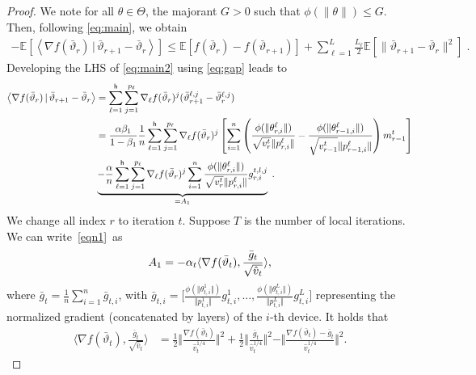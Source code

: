 \documentclass[11pt]{article}
\newcommand{\eqsp}{\;}
\def\EE{\mathbb{E}}
\newcommand{\pscal}[2]{\left\langle#1\,|\,#2 \right\rangle}
\def\tot{\mathsf{h}}
\begin{document}
\begin{proof}
We note for all $\theta \in \Theta$, the majorant $G > 0$ such that $\phi(\|\theta \|) \leq G$. 
Then, following \eqref{eq:main}, we obtain
\begin{align}\label{eq:main2}
- \EE[  \pscal{\nabla f(\bar{\vartheta}_r)}{\bar{\vartheta}_{r+1} - \bar{\vartheta}_r}]  \leq  \EE[ f(\bar{\vartheta}_r) - f(\bar{\vartheta}_{r+1})] + \sum_{\ell =1}^L \frac{L_\ell}{2} \EE[  \| \bar{\vartheta}_{r+1} - \bar{\vartheta}_r \|^2] \eqsp.
\end{align}
Developing the LHS of \eqref{eq:main2} using \eqref{eq:gap} leads to
\begin{align} \notag
\pscal{\nabla f(\bar{\vartheta}_r)}{\bar{\vartheta}_{r+1} - \bar{\vartheta}_r} &= \sum_{\ell=1}^\tot \sum_{j=1}^{p_\ell} \nabla_{\ell} f(\bar{\vartheta}_r)^j (\bar{\vartheta}^{\ell,j}_{r+1} - \bar{\vartheta}^{\ell,j}_r)  \\ \notag
& =  \frac{\alpha \beta_1}{1-\beta_1}\frac{1}{n}  \sum_{\ell=1}^\tot \sum_{j=1}^{p_\ell} \nabla_{\ell} f(\bar{\vartheta}_r)^j \left[   \sum_{i = 1}^n  \left( \frac{\phi(\|\theta_{r,i}^{\ell}\|)}{\sqrt{v^{t}_{r}} \|p_{r,i}^{\ell}\|} - \frac{\phi(\|\theta_{r-1,i}^{\ell}\|)}{\sqrt{v^{t}_{r-1}} \|p_{r-1,i}^{\ell}\|} \right) m^{t}_{r-1}  \right] \\ \label{eqn1}
& \underbrace{ -\frac{\alpha}{n} \sum_{\ell=1}^\tot \sum_{j=1}^{p_\ell} \nabla_{\ell} f(\bar{\vartheta}_r)^j  \sum_{i = 1}^n \frac{\phi(\|\theta_{r,i}^{\ell}\|)}{\sqrt{v^{t}_{r}} \|p_{r,i}^{\ell}\|} g_{r,i}^{t,l,j}}_{= A_1}   \eqsp.
\end{align}
We change all index $r$ to iteration $t$. 
Suppose $T$ is the number of local iterations. We can write~\eqref{eqn1}~as
\begin{align}\notag
    A_1=-\alpha_t \langle \nabla f(\bar \vartheta_t),\frac{\bar g_t}{\sqrt{\hat v_t}} \rangle,
\end{align}
where $\bar g_t=\frac{1}{n}\sum_{i=1}^n \bar g_{t,i}$, with $\bar g_{t,i}=\Big[\frac{\phi(\Vert \theta_{t,i}^1\Vert)}{\Vert p_{t,i}^1\Vert}g_{t,i}^1,..., \frac{\phi(\Vert \theta_{t,i}^L\Vert)}{\Vert p_{t,i}^L\Vert}g_{t,i}^L   \Big]$ representing the normalized gradient (concatenated by layers) of the $i$-th device. It holds that
\begin{align}
    \langle \nabla f(\bar \vartheta_t),\frac{\bar g_t}{\sqrt{\hat v_t}} \rangle&=\frac{1}{2}\Vert \frac{\nabla f(\bar\vartheta_t) }{\hat v_t^{1/4}}\Vert^2+\frac{1}{2}\Vert \frac{\bar g_t }{\hat v_t^{1/4}}\Vert^2-\Vert \frac{\nabla f(\bar\vartheta_t)-\bar g_t }{\hat v_t^{1/4}}\Vert^2.  \label{eqn:x1}

\end{align}
\end{proof}
\end{document}
